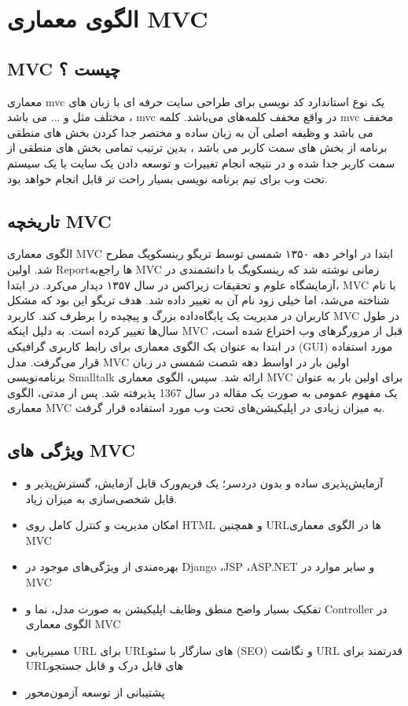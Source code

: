 \section{الگوی معماری MVC}
\subsection{MVC‌ چیست ؟}
معماری mvc یک نوع استاندارد کد نویسی برای طراحی سایت حرفه ای با زبان های مختلف مثل
 و ... می باشد ، mvc در واقع مخفف کلمه‌های
  می‌باشد.
کلمه mvc مخفف
 می باشد و وظیفه اصلی آن به زبان ساده و مختصر جدا کردن بخش های منطقی برنامه از بخش های سمت کاربر می باشد ، بدین ترتیب تمامی بخش های منطقی از سمت کاربر جدا شده و در نتیجه انجام تغییرات و توسعه دادن یک سایت یا یک سیستم تحت وب برای تیم برنامه نویسی بسیار راحت تر قابل انجام خواهد بود.

\subsection{تاریخچه MVC}
الگوی معماری MVC ابتدا در ‌اواخر دهه ۱۳۵۰ شمسی توسط تریگو رینسکویگ
 مطرح شد. اولین Report‌ها راجع‌به MVC زمانی نوشته شد که رینسکویگ با دانشمندی در آزمایشگاه علوم و تحقیقات زیراکس
  در سال ۱۳۵۷ دیدار می‌کرد. در ابتدا، MVC با نام
 شناخته می‌شد، اما خیلی زود نام آن به
 تغییر داده شد. هدف تریگو این بود که مشکل کاربران در مدیریت یک پایگاه‌داده بزرگ و پیچیده را برطرف کند.
کاربرد MVC‌ در طول سال‌ها تغییر کرده است. به دلیل اینکه MVC‌ قبل از مرورگرهای وب اختراع شده است، در ابتدا به عنوان یک الگوی معماری برای رابط کاربری گرافیکی (GUI) مورد استفاده قرار می‌گرفت. مدل MVC اولین بار در اواسط دهه شصت شمسی در زبان برنامه‌نویسی Smalltalk ارائه شد. سپس، الگوی معماری MVC برای اولین بار به عنوان یک مفهوم عمومی به صورت یک مقاله در سال 1367 پذیرفته شد. پس از مدتی، الگوی معماری MVC به میزان زیادی در اپلیکیشن‌های تحت وب مورد استفاده قرار گرفت.

\subsection{ویژگی های MVC}
\begin{itemize}
	\item
	آزمایش‌پذیری ساده و بدون دردسر؛ یک فریم‌ورک قابل آزمایش، گسترش‌پذیر و قابل شخصی‌سازی به میزان زیاد.
	\item
	امکان مدیریت و کنترل کامل روی HTML و همچنین URLها در الگوی معماری MVC
	\item
	بهره‌مندی از ویژگی‌های موجود در Django ،JSP ،ASP.NET و سایر موارد در MVC
	\item
	تفکیک بسیار واضح منطق وظایف اپلیکیشن به صورت مدل، نما و Controller‌ در الگوی معماری MVC
	\item
	مسیریابی URL‌ برای URLهای سازگار با سئو (SEO) و نگاشت URL قدرتمند برای URLهای قابل درک و قابل جستجو
	\item
	پشتیبانی از توسعه آزمون‌محور
\end{itemize}


